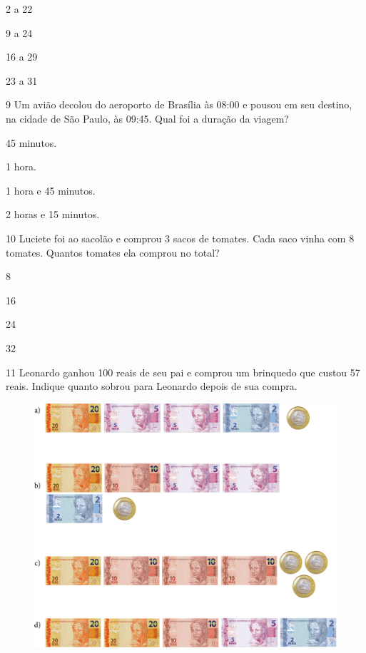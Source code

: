 \begin{escolha}[itemsep=-5pt]
\item 2 a 22

\item 9 a 24

\item 16 a 29

\item 23 a 31
\end{escolha}

\num{9} Um avião decolou do aeroporto de Brasília às 08:00 e pousou em seu
destino, na cidade de São Paulo, às 09:45. Qual foi a duração da viagem?

\begin{escolha}[itemsep=-5pt]
\item 45 minutos.

\item 1 hora.

\item 1 hora e 45 minutos.

\item 2 horas e 15 minutos.
\end{escolha}

\num{10} Luciete foi ao sacolão e comprou 3 sacos de tomates. Cada saco vinha com
8 tomates. Quantos tomates ela comprou no total?

\begin{escolha}[itemsep=-5pt]
\item 8

\item 16

\item 24

\item 32
\end{escolha}

\num{11} Leonardo ganhou 100 reais de seu pai e comprou um brinquedo que custou
57 reais. Indique quanto sobrou para Leonardo depois de sua compra.

\begin{figure}[H]
\includegraphics[width=\textwidth]{./media/image131.png}
\end{figure}

